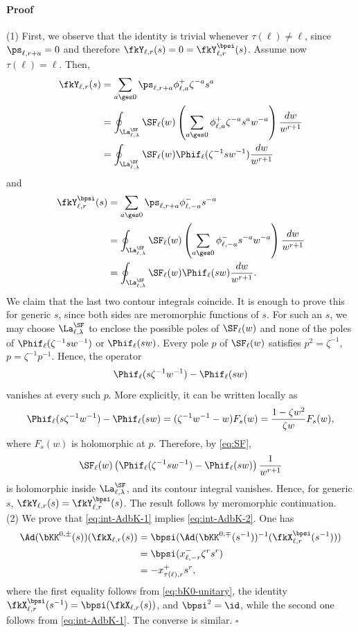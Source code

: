 \documentclass[reqno]{amsart}
\numberwithin{equation}{section}
\newenvironment{pf}{\medskip\paragraph{{\sc Proof}}}{\hfill$\square$\par\medskip}
\begin{document}
\begin{pf}
(1) First, we observe that the identity is trivial whenever $\tau(\ell)\neq\ell$, since
$\ps_{\ell, r+a}=0$ and therefore $\fkY_{\ell,r}(s)=0=\fkY^{\bpsi}_{\ell,r}(s)$. Assume now $\tau(\ell)=\ell$. Then,
\begin{align}
	\fkY_{\ell,r}(s)&=\sum_{a\ges0}\ps_{\ell,r+a}\phi^+_{\ell,a}\zeta^{-a}s^a\\
	&=\oint_{\La_{\ell,\lambda}^\SF}\SF_\ell(w)\left(\sum_{a\ges0}\phi_{\ell,a}^+\zeta^{-a}s^aw^{-a}\right)\frac{dw}{w^{r+1}}\\
	&=\oint_{\La_{\ell,\lambda}^\SF}\SF_\ell(w)\Phif_\ell(\zeta^{-1}sw^{-1})\frac{dw}{w^{r+1}}
\end{align}
and
\begin{align}
	\fkY^{\bpsi}_{\ell,r}(s)&=\sum_{a\ges0}\ps_{\ell,r+a}\phi^-_{\ell,-a}s^{-a}\\
	&=\oint_{\La_{\ell,\lambda}^\SF}\SF_\ell(w)\left(\sum_{a\ges0}\phi_{\ell,-a}^-s^{-a}w^{-a}\right)\frac{dw}{w^{r+1}}\\
	&=\oint_{\La_{\ell,\lambda}^\SF}\SF_\ell(w)\Phif_\ell(sw)\frac{dw}{w^{r+1}}.
\end{align}
We claim that the last two contour integrals coincide. It is enough to prove
this for generic $s$, since both sides are meromorphic functions of $s$.
For such an $s$, we may choose $\La_{\ell,\lambda}^\SF$ to enclose the
possible poles of $\SF_\ell(w)$ and none of the poles of
$\Phif_\ell(\zeta^{-1}sw^{-1})$ or $\Phif_\ell(sw)$. Every pole $p$ of $\SF_\ell(w)$
satisfies $p^2=\zeta^{-1}$, \ie $p=\zeta^{-1}p^{-1}$. Hence, the operator
\[\Phif_\ell(s\zeta^{-1}w^{-1})-\Phif_\ell(sw)\]
vanishes at every such $p$. More explicitly, it can be written locally as
\[
\Phif_\ell(s\zeta^{-1}w^{-1})-\Phif_\ell(sw)
=
(\zeta^{-1}w^{-1}-w)F_s(w)
=
\frac{1-\zeta w^2}{\zeta w}F_s(w),
\]
where $F_s(w)$ is holomorphic at $p$. Therefore, by \eqref{eq:SF},
\[
\SF_\ell(w)
\left(\Phif_\ell(\zeta^{-1}sw^{-1})-\Phif_\ell(sw)\right)
\frac{1}{w^{r+1}}
\]
is holomorphic inside $\La_{\ell,\lambda}^\SF$, and its contour integral
vanishes. Hence, for generic
$s$, $\fkY_{\ell,r}(s)=\fkY^{\bpsi}_{\ell,r}(s)$. The result follows by meromorphic continuation.\\

\noindent
(2) We prove that \eqref{eq:int-AdbK-1} implies \eqref{eq:int-AdbK-2}. One has
\begin{align}
	\Ad(\bKK^{0,\pm}(s))(\fkX_{\ell,r}(s))&=\bpsi(\Ad(\bKK^{0,\mp}(s^{-1}))^{-1}(\fkX_{\ell,r}^{\bpsi}(s^{-1})))\\
	&=\bpsi(x_{\ell,-r}^-\zeta^rs^{r})\\
	&=-x^+_{\tau(\ell),r}s^r,
\end{align}
where the first equality follows from \eqref{eq:bK0-unitary}, the identity $\fkX_{\ell,r}^{\bpsi}(s^{-1})=\bpsi(\fkX_{\ell,r}(s))$, and $\bpsi^2=\id$, while the second one follows from \eqref{eq:int-AdbK-1}. The converse is similar.
\end{pf}
\end{document}
